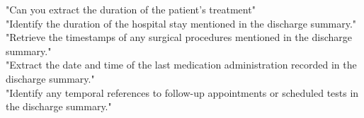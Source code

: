 "Can you extract the duration of the patient's treatment"\\
"Identify the duration of the hospital stay mentioned in the discharge summary."\\
"Retrieve the timestamps of any surgical procedures mentioned in the discharge summary."\\
"Extract the date and time of the last medication administration recorded in the discharge summary."\\
"Identify any temporal references to follow-up appointments or scheduled tests in the discharge summary."